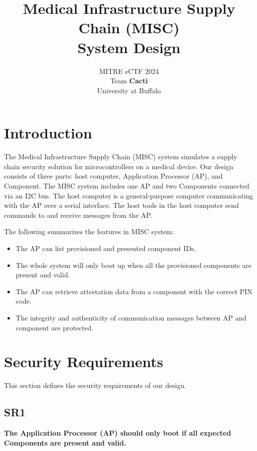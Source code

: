 \documentclass[11pt,oneside,onecolumn,letterpaper]{article}
\title{Medical Infrastructure Supply Chain (MISC) \\ System Design}
\author{MITRE eCTF 2024\\Team \textbf{Cacti}\\ University at Buffalo}
\date{}
\begin{document}
\normalsize


\maketitle

\renewcommand{\thepage}{System Design, Team Cacti, University at Buffalo--\arabic{page}}
\setcounter{page}{1} \normalsize
%

\newcommand{\flagRollback}{\textsf{Rollback}\xspace}

\section{Introduction}
The Medical Infrastructure Supply Chain (MISC) system simulates a supply chain security solution for microcontrollers on a medical device.
Our design consists of three parts: host computer, Application Processor (AP), and Component.
The MISC system includes one AP and two Components connected via an I2C bus.
The host computer is a general-purpose computer communicating with the AP over a serial interface.
The host tools in the host computer send commands to and receive messages from the AP.

The following summarizes the features in MISC system:
\begin{itemize}
	\item The AP can list provisioned and presented component IDs.
	\item The whole system will only boot up when all the provisioned components are present and valid.
	\item The AP can retrieve attestation data from a component with the correct PIN code.
	\item The integrity and authenticity of communication messages between AP and component are protected.
\end{itemize}

\section{Security Requirements}

This section defines the security requirements of our design.

\subsection{SR1}
\textbf{The Application Processor (AP) should only boot if all expected Components are present and valid.}
\end{document}
